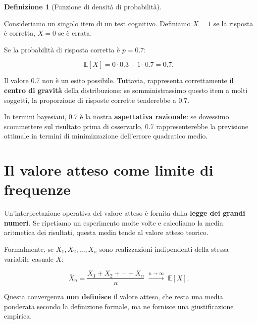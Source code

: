 \documentclass[
  italian,
  letterpaper,
  a4paper,
  11pt,
  open=any]{scrbook}
\theoremstyle{plain}
\theoremstyle{definition}
\theoremstyle{definition}
\newtheorem{definition}{Definizione}[chapter]
\theoremstyle{remark}
\begin{document}
\begin{definition}[Funzione di densità di
probabilità]
\begin{tcolorbox}[enhanced jigsaw, arc=.35mm, bottomrule=.15mm, bottomtitle=1mm, breakable, colback=white, colbacktitle=quarto-callout-note-color!10!white, colframe=quarto-callout-note-color-frame, coltitle=black, left=2mm, leftrule=.75mm, opacityback=0, opacitybacktitle=0.6, rightrule=.15mm, title=\textcolor{quarto-callout-note-color}{\faInfo}\hspace{0.5em}{Esempio: risposta a un item dicotomico}, titlerule=0mm, toprule=.15mm, toptitle=1mm]

Consideriamo un singolo item di un test cognitivo. Definiamo \(X = 1\)
se la risposta è corretta, \(X = 0\) se è errata.

Se la probabilità di risposta corretta è \(p = 0.7\):

\[
\mathbb{E}[X] = 0 \cdot 0.3 + 1 \cdot 0.7 = 0.7.
\]

Il valore 0.7 non è un esito possibile. Tuttavia, rappresenta
correttamente il \textbf{centro di gravità} della distribuzione: se
somministrassimo questo item a molti soggetti, la proporzione di
risposte corrette tenderebbe a 0.7.

In termini bayesiani, 0.7 è la nostra \textbf{aspettativa razionale}: se
dovessimo scommettere sul risultato prima di osservarlo, 0.7
rappresenterebbe la previsione ottimale in termini di minimizzazione
dell'errore quadratico medio.

\end{tcolorbox}

\section{Il valore atteso come limite di
frequenze}\label{sec-expected-value-as-limit}

Un'interpretazione operativa del valore atteso è fornita dalla
\textbf{legge dei grandi numeri}. Se ripetiamo un esperimento molte
volte e calcoliamo la media aritmetica dei risultati, questa media tende
al valore atteso teorico.

Formalmente, se \(X_1, X_2, \ldots, X_n\) sono realizzazioni
indipendenti della stessa variabile casuale \(X\):

\[
\bar{X}_n = \frac{X_1 + X_2 + \cdots + X_n}{n}
\;\xrightarrow{n \to \infty}\;
\mathbb{E}[X].
\]

Questa convergenza \textbf{non definisce} il valore atteso, che resta
una media ponderata secondo la definizione formale, ma ne fornisce una
giustificazione empirica.


\end{definition}
\end{document}
